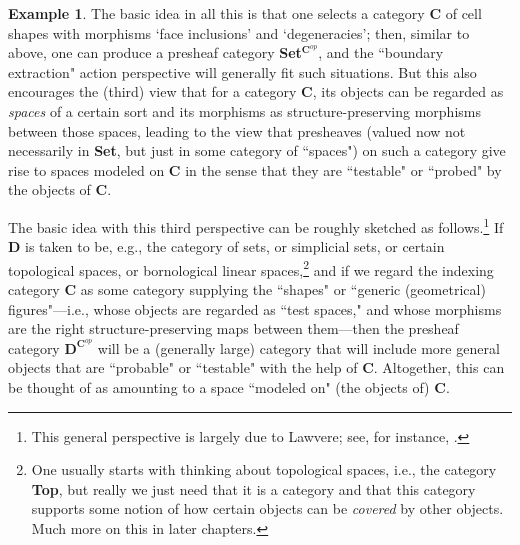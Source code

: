 \documentclass[11pt]{book}
\theoremstyle{definition}
\newtheorem{example}{Example}[section]
\theoremstyle{definition}
\theoremstyle{definition}
\theoremstyle{theorem}
\theoremstyle{definition}
\begin{document}
\begin{example}
	The basic idea in all this is that one selects a category $\textbf{C}$ of cell shapes with morphisms `face inclusions' and `degeneracies'; then, similar to above, one can produce a presheaf category \textbf{Set}$^{\textbf{C}^{op}}$, and the ``boundary extraction" action perspective will generally fit such situations. But this also encourages the (third) view that for a category $\textbf{C}$, its objects can be regarded as \textit{spaces} of a certain sort and its morphisms as structure-preserving morphisms between those spaces, leading to the view that presheaves (valued now not necessarily in \textbf{Set}, but just in some category of ``spaces") on such a category give rise to spaces modeled on \textbf{C} in the sense that they are ``testable" or ``probed" by the objects of \textbf{C}. \par 
	The basic idea with this third perspective can be roughly sketched as follows.\footnote{This general perspective is largely due to Lawvere; see, for instance, \cite{lawvere_taking_2005}.} If \textbf{D} is taken to be, e.g., the category of sets, or simplicial sets, or certain topological spaces, or bornological linear spaces,\footnote{One usually starts with thinking about topological spaces, i.e., the category \textbf{Top}, but really we just need that it is a category and that this category supports some notion of how certain objects can be \textit{covered} by other objects. Much more on this in later chapters.} and if we regard the indexing category $\textbf{C}$ as some category supplying the ``shapes" or ``generic (geometrical) figures"---i.e., whose objects are regarded as ``test spaces," and whose morphisms are the right structure-preserving maps between them---then the presheaf category $\textbf{D}^{\textbf{C}^{op}}$ will be a (generally large) category that will include more general objects that are ``probable" or ``testable" with the help of $\textbf{C}$. Altogether, this can be thought of as amounting to a space ``modeled on" (the objects of) \textbf{C}. \par 

\end{example}
\end{document}
